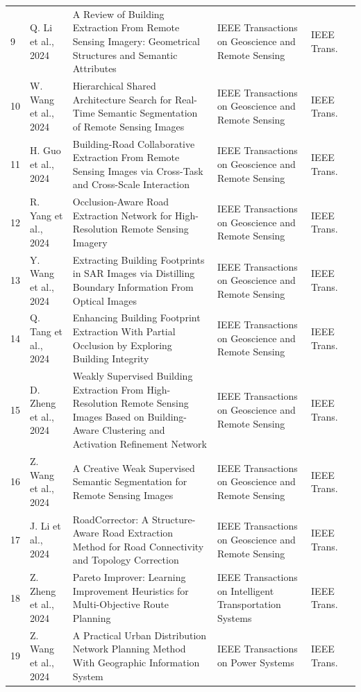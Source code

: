 \begin{landscape}
\begin{longtable}{@{}L{0.6cm}L{3.4cm}L{8.2cm}L{5.6cm}L{2.0cm}L{1.2cm}@{}}
9 & Q. Li et al., 2024 & A Review of Building Extraction From Remote Sensing Imagery: Geometrical Structures and Semantic Attributes & IEEE Transactions on Geoscience and Remote Sensing & IEEE Trans. & \cite{L17} \\
10 & W. Wang et al., 2024 & Hierarchical Shared Architecture Search for Real-Time Semantic Segmentation of Remote Sensing Images & IEEE Transactions on Geoscience and Remote Sensing & IEEE Trans. & \cite{L18} \\
11 & H. Guo et al., 2024 & Building-Road Collaborative Extraction From Remote Sensing Images via Cross-Task and Cross-Scale Interaction & IEEE Transactions on Geoscience and Remote Sensing & IEEE Trans. & \cite{L19} \\
12 & R. Yang et al., 2024 & Occlusion-Aware Road Extraction Network for High-Resolution Remote Sensing Imagery & IEEE Transactions on Geoscience and Remote Sensing & IEEE Trans. & \cite{L20} \\
13 & Y. Wang et al., 2024 & Extracting Building Footprints in SAR Images via Distilling Boundary Information From Optical Images & IEEE Transactions on Geoscience and Remote Sensing & IEEE Trans. & \cite{L21} \\
14 & Q. Tang et al., 2024 & Enhancing Building Footprint Extraction With Partial Occlusion by Exploring Building Integrity & IEEE Transactions on Geoscience and Remote Sensing & IEEE Trans. & \cite{L22} \\
15 & D. Zheng et al., 2024 & Weakly Supervised Building Extraction From High-Resolution Remote Sensing Images Based on Building-Aware Clustering and Activation Refinement Network & IEEE Transactions on Geoscience and Remote Sensing & IEEE Trans. & \cite{L23} \\
16 & Z. Wang et al., 2024 & A Creative Weak Supervised Semantic Segmentation for Remote Sensing Images & IEEE Transactions on Geoscience and Remote Sensing & IEEE Trans. & \cite{L24} \\
17 & J. Li et al., 2024 & RoadCorrector: A Structure-Aware Road Extraction Method for Road Connectivity and Topology Correction & IEEE Transactions on Geoscience and Remote Sensing & IEEE Trans. & \cite{L38} \\
18 & Z. Zheng et al., 2024 & Pareto Improver: Learning Improvement Heuristics for Multi-Objective Route Planning & IEEE Transactions on Intelligent Transportation Systems & IEEE Trans. & \cite{L40} \\
19 & Z. Wang et al., 2024 & A Practical Urban Distribution Network Planning Method With Geographic Information System & IEEE Transactions on Power Systems & IEEE Trans. & \cite{L42} \\

\end{longtable}
\end{landscape}
